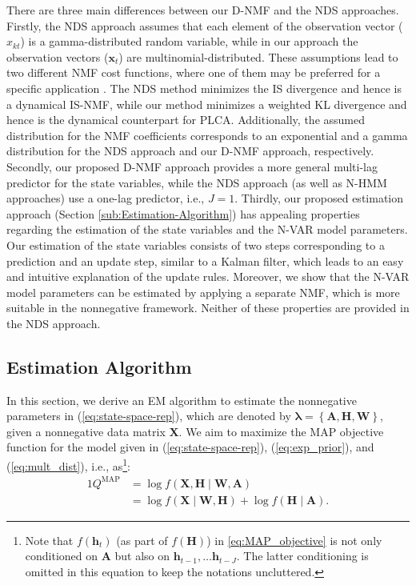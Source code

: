 \documentclass[10pt,twocolumn,twoside] {IEEEtran}
\begin{document}
There are three main differences
between our D-NMF and the NDS approaches. Firstly, the NDS approach assumes that each element of the
observation vector ($x_{kt}$) is a gamma-distributed random variable,
while in our approach the observation vectors ($\mathbf{x}_{t}$) are
multinomial-distributed. These assumptions lead to two different
NMF cost functions, where one of them may be preferred for a specific application \cite{Smaragdis2014}. The NDS method minimizes the IS divergence
and hence is a dynamical IS-NMF, while our method minimizes a weighted
KL divergence and hence is the dynamical counterpart for PLCA.
Additionally, the assumed distribution for the NMF coefficients corresponds to an exponential and a gamma distribution for the NDS approach and our D-NMF approach, respectively. Secondly, our proposed D-NMF approach provides a more general multi-lag
predictor for the state variables, while the NDS approach (as well as N-HMM approaches)
use a one-lag predictor, i.e., $J=1$. Thirdly, our proposed estimation
approach (Section \ref{sub:Estimation-Algorithm}) has appealing
properties regarding the estimation of the state variables and the
N-VAR model parameters. Our estimation of the state variables consists
of two steps corresponding to a prediction and an update step,
similar to a Kalman filter, which leads to an easy and intuitive explanation
of the update rules. Moreover, we show that the N-VAR model parameters
can be estimated by applying a separate NMF, which is more suitable
in the nonnegative framework. Neither of these properties are provided
in the NDS approach.
\subsection{Estimation Algorithm\label{sub:Estimation-Algorithm}}

In this section, we derive an EM algorithm to estimate the nonnegative parameters
in (\ref{eq:state-space-rep}), which are denoted by $\boldsymbol{\lambda}=\left\{ \mathbf{A},\mathbf{H},\mathbf{W}\right\} $,
given a nonnegative data matrix $\mathbf{X}$. We aim to maximize the
MAP objective function for the model given in (\ref{eq:state-space-rep}),
(\ref{eq:exp_prior}), and (\ref{eq:mult_dist}), i.e.,
as\footnote{Note that $f\left(\mathbf{h}_t\right)$ (as part of $f\left(\mathbf{H}\right)$)
  in \eqref{eq:MAP_objective} is not only conditioned on $\mathbf{A}$
  but also on ${\mathbf{h}}_{t-1},\ldots{\mathbf{h}}_{t-J}$. The latter conditioning is omitted in this equation to keep the notations uncluttered.}:
\begin{alignat}{1}
Q^{\text{MAP}} & =\log f\left(\mathbf{X},\mathbf{H}\mid\mathbf{W},\mathbf{A}\right)\nonumber \\
 & =\log f\left(\mathbf{X}\mid\mathbf{W},\mathbf{H}\right)+\log f\left(\mathbf{H}\mid\mathbf{A}\right).\label{eq:MAP_objective}
\end{alignat}
\end{document}
